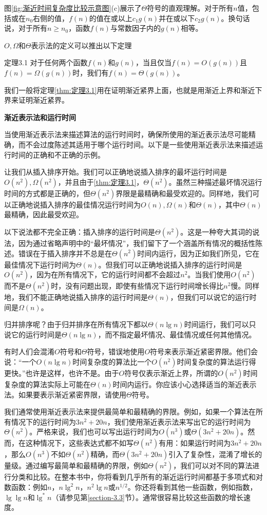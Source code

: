 \documentclass[lang=cn,newtx,10pt,scheme=chinese]{elegantbook}
\begin{document}
图\ref{fig:渐近时间复杂度比较示意图}(c)展示了$\Theta$符号的直观理解。对于所有$n$值，包括或在$n_0$右侧的值，$f(n)$的值在或以上$c_1 g(n)$并在或以下$c_2 g(n)$。换句话说，对于所有$n \geq n_0$，函数$f(n)$与常数因子内的$g(n)$相等。

$O, \Omega$和$\Theta$表示法的定义可以推出以下定理

\begin{theorem}{}{定理3.1}
对于任何两个函数$f(n)$和$g(n)$，当且仅当$f(n)=O(g(n))$且$f(n)=\Omega(g(n))$时，我们有$f(n)=\Theta(g(n))$。
\end{theorem}

我们一般将定理\ref{thm:定理3.1}用在证明渐近紧界上面，也就是用渐近上界和渐近下界来证明渐近紧界。

\textbf{渐近表示法和运行时间}

当使用渐近表示法来描述算法的运行时间时，确保所使用的渐近表示法尽可能精确，而不会过度陈述其适用于哪个运行时间。以下是一些使用渐近表示法来描述运行时间的正确和不正确的示例。

让我们从插入排序开始。我们可以正确地说插入排序的最坏运行时间是$O(n^2), \Omega(n^2)$，并且由于\ref{thm:定理3.1}，$\Theta(n^2)$。虽然三种描述最坏情况运行时间的方式都是正确的，但$\Theta(n^2)$界限是最精确和最受欢迎的。同样地，我们可以正确地说插入排序的最佳情况运行时间为$O(n), \Omega(n)$和$\Theta(n)$，其中$\Theta(n)$最精确，因此最受欢迎。

以下说法都不完全正确：插入排序的运行时间是$\Theta(n^2)$。这是一种夸大其词的说法，因为通过省略声明中的``最坏情况''，我们留下了一个涵盖所有情况的概括性陈述。错误在于插入排序并不总是在$\Theta(n^2)$时间内运行，因为正如我们所见，它在最佳情况下运行时间为$\Theta(n)$。但我们可以正确地说插入排序的运行时间是$O(n^2)$，因为在所有情况下，它的运行时间都不会超过$n^2$。当我们使用$O(n^2)$而不是$\Theta(n^2)$时，没有问题出现，即使有些情况下运行时间增长得比$n^2$慢。同样地，我们不能正确地说插入排序的运行时间是$\Theta(n)$，但我们可以说它的运行时间是$\Omega(n)$。

归并排序呢？由于归并排序在所有情况下都以$\Theta(n\lg n)$时间运行，我们可以只说它的运行时间是$\Theta(n\lg n)$，而不指定最坏情况、最佳情况或任何其他情况。

有时人们会混淆$O$符号和$\Theta$符号，错误地使用$O$符号来表示渐近紧密界限。他们会说：“一个$O(n\lg n)$时间复杂度的算法比一个$O(n^2)$时间复杂度的算法运行得更快。”也许是这样，也许不是。由于$O$符号仅表示渐近上界，所谓的$O(n^2)$时间复杂度的算法实际上可能在$\Theta(n)$时间内运行。你应该小心选择适当的渐近表示法。如果要表示渐近紧密界限，请使用$\Theta$符号。

我们通常使用渐近表示法来提供最简单和最精确的界限。例如，如果一个算法在所有情况下的运行时间为$3n^2+20n$，我们使用渐近表示法来写出它的运行时间为$\Theta(n^2)$。严格来说，我们也可以写出运行时间为$O(n^3)$或$\Theta(3n^2+20n)$。然而，在这种情况下，这些表达式都不如写$\Theta(n^2)$有用：如果运行时间为$3n^2+20n$，那么$O(n^3)$不如$\Theta(n^2)$精确，而$\Theta(3n^2+20n)$引入了复杂性，混淆了增长的量级。通过编写最简单和最精确的界限，例如$\Theta(n^2)$，我们可以对不同的算法进行分类和比较。在整本书中，你将看到几乎所有的渐近运行时间都基于多项式和对数函数：例如$n$，$n \lg ^2 n$，$n^2 \lg n$或$n^{1 / 2}$。你还将看到其他一些函数，例如指数，$\lg \lg n$和$\lg ^* n$（请参见第\ref{section-3.3}节）。通常很容易比较这些函数的增长速度。
\end{document}
